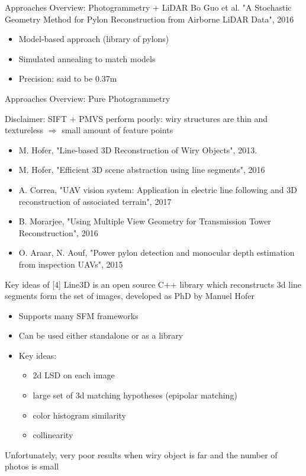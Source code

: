 \documentclass{beamer}
\begin{document}
\begin{frame}[t, fragile]{Approaches Overview: Photogrammetry + LiDAR}
 Bo Guo et al. "A Stochastic Geometry Method for Pylon
Reconstruction from Airborne LiDAR Data", 2016
\begin{itemize}
\item Model-based approach (library of pylons)
\item Simulated annealing to match models
\item Precision: said to be 0.37m
\end{itemize}
\end{frame}

\begin{frame}[t, fragile]{Approaches Overview: Pure Photogrammetry}

Disclaimer: SIFT + PMVS perform poorly: wiry structures are thin and textureless $\Rightarrow$ small amount of feature points 

\begin{itemize}
\item [4] M. Hofer, "Line-based 3D Reconstruction of Wiry Objects", 2013.
\item [4'] M. Hofer, "Efficient 3D scene abstraction using line segments", 2016
\item [5] A. Correa, "UAV vision system: Application in electric line following and 3D reconstruction of associated terrain", 2017
\item [6] B. Morarjee, "Using Multiple View Geometry for Transmission Tower Reconstruction", 2016

\item [7] O. Araar, N. Aouf, "Power pylon detection and monocular depth
estimation from inspection UAVs", 2015
\end{itemize}
\end{frame}

\begin{frame}[t, fragile]{Key ideas of [4]}
Line3D is an open source C++ library which reconstructs 3d line segments form the set of images, developed as PhD by Manuel Hofer
\begin{itemize}

\item Supports many SFM frameworks
\item Can be used either standalone or as a library
\item Key ideas: 
\begin{itemize}
\item 2d LSD on each image
\item large set of 3d matching hypotheses (epipolar matching)
\item color histogram similarity
\item collinearity
\end{itemize}
\end{itemize}
Unfortunately, very poor results when wiry object is far and the number of photos is small
\end{frame}
\end{document}

